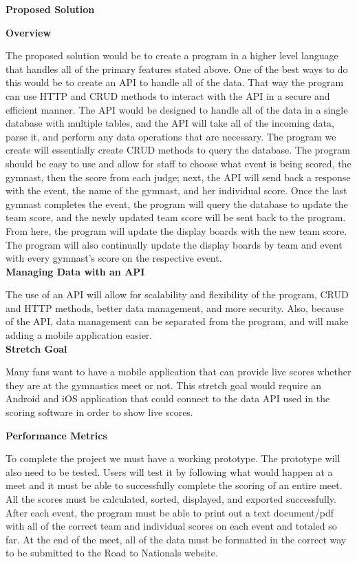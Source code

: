 \documentclass[letterpaper,10pt,draftclsnofoot,onecolumn,]{IEEEtran}
\begin{document}
\begin{center}
\textbf{Proposed Solution}\\
\end{center}

\textbf{Overview}
\par The proposed solution would be to create a program in a higher level language that handles all of the primary features stated above. One of the best ways to do this would be to create an API to handle all of the data. That way the program can use HTTP and CRUD methods to interact with the API in a secure and efficient manner. The API would be designed to handle all of the data in a single database with multiple tables, and the API will take all of the incoming data, parse it, and perform any data operations that are necessary. The program we create will essentially create CRUD methods to query the database. The program should be easy to use and allow for staff to choose what event is being scored, the gymnast, then the score from each judge; next, the API will send back a response with the event, the name of the gymnast, and her individual score. Once the last gymnast completes the event, the program will query the database to update the team score, and the newly updated team score will be sent back to the program. From here, the program will update the display boards with the new team score. The program will also continually update the display boards by team and event with every gymnast's score on the respective event.\\

\textbf{Managing Data with an API}
\par The use of an API will allow for scalability and flexibility of the program, CRUD and HTTP methods, better data management, and more security. Also, because of the API, data management can be separated from the program, and will make adding a mobile application easier.\\

\textbf{Stretch Goal}
\par Many fans want to have a mobile application that can provide live scores whether they are at the gymnastics meet or not. This stretch goal would require an Android and iOS application that could connect to the data API used in the scoring software in order to show live scores.\\

\begin{center}
\textbf{Performance Metrics}\\
\end{center}
To complete the project we must have a working prototype. The prototype will also need to be tested. Users will test it by following what would happen at a meet and it must be able to successfully complete the scoring of an entire meet. All the scores must be calculated, sorted, displayed, and exported successfully. After each event, the program must be able to print out a text document/pdf with all of the correct team and individual scores on each event and totaled so far. At the end of the meet, all of the data must be formatted in the correct way to be submitted to the Road to Nationals website.
\end{document}
